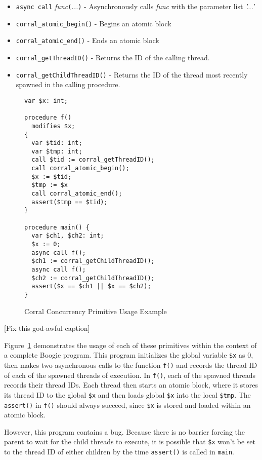 \begin{itemize}
\item \lstinline|async call| \emph{func}\lstinline|(|\emph{...}\lstinline|)| - Asynchronously calls \emph{func} with the parameter list \emph{'...'}
\item \lstinline|corral_atomic_begin()| - Begins an atomic block
\item \lstinline|corral_atomic_end()| - Ends an atomic block
\item \lstinline|corral_getThreadID()| - Returns the ID of the calling thread.
\item \lstinline|corral_getChildThreadID()| - Returns the ID of the
  thread most recently spawned in the calling procedure. 
\end{itemize}

\begin{figure}[h]
\centering
\begin{lstlisting}[language=boogie]
var $x: int;

procedure f() 
  modifies $x;
{
  var $tid: int;
  var $tmp: int;
  call $tid := corral_getThreadID();
  call corral_atomic_begin();
  $x := $tid;
  $tmp := $x
  call corral_atomic_end();
  assert($tmp == $tid);
}

procedure main() {
  var $ch1, $ch2: int;
  $x := 0;
  async call f();
  $ch1 := corral_getChildThreadID();
  async call f();
  $ch2 := corral_getChildThreadID();
  assert($x == $ch1 || $x == $ch2);
}
\end{lstlisting}
\caption{Corral Concurrency Primitive Usage Example}
\label{fig:corralprimitives}
\end{figure}

[Fix this god-awful caption]

Figure~\ref{fig:corralprimitives} demonstrates the usage of each of
these primitives within the context of a complete Boogie program.
This program initializes the global variable \lstinline|$x| as 0, then
makes two asynchronous calls to the function \lstinline|f()| and
records the thread ID of each of the spawned threads of execution.  In
\lstinline|f()|, each of the spawned threads records their thread IDs.
Each thread then starts an atomic block, where it stores its thread ID
to the global \lstinline|$x| and then loads global \lstinline|$x| into
the local \lstinline|$tmp|.  The \lstinline|assert()| in
\lstinline|f()| should always succeed, since \lstinline|$x| is stored
and loaded within an atomic block. 

However, this program contains a bug.  Because there is no barrier
forcing the parent to wait for the child threads to execute, it is
possible that \lstinline|$x| won't be set to the thread ID of either
children by the time \lstinline|assert()| is called in
\lstinline|main|. 

